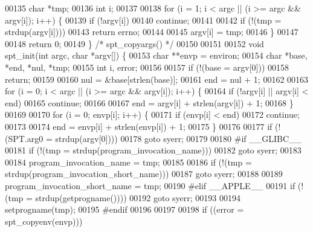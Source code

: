\begin{DoxyCode}
00135     \textcolor{keywordtype}{char} *tmp;
00136     \textcolor{keywordtype}{int} i;
00137 
00138     \textcolor{keywordflow}{for} (i = 1; i < argc || (i >= argc && argv[i]); i++) \{
00139         \textcolor{keywordflow}{if} (!argv[i])
00140             \textcolor{keywordflow}{continue};
00141 
00142         \textcolor{keywordflow}{if} (!(tmp = strdup(argv[i])))
00143             \textcolor{keywordflow}{return} errno;
00144 
00145         argv[i] = tmp;
00146     \}
00147 
00148     \textcolor{keywordflow}{return} 0;
00149 \} \textcolor{comment}{/* spt\_copyargs() */}
00150 
00151 
00152 \textcolor{keywordtype}{void} spt\_init(\textcolor{keywordtype}{int} argc, \textcolor{keywordtype}{char} *argv[]) \{
00153         \textcolor{keywordtype}{char} **envp = environ;
00154     \textcolor{keywordtype}{char} *base, *end, *nul, *tmp;
00155     \textcolor{keywordtype}{int} i, error;
00156 
00157     \textcolor{keywordflow}{if} (!(base = argv[0]))
00158         \textcolor{keywordflow}{return};
00159 
00160     nul = &base[strlen(base)];
00161     end = nul + 1;
00162 
00163     \textcolor{keywordflow}{for} (i = 0; i < argc || (i >= argc && argv[i]); i++) \{
00164         \textcolor{keywordflow}{if} (!argv[i] || argv[i] < end)
00165             \textcolor{keywordflow}{continue};
00166 
00167         end = argv[i] + strlen(argv[i]) + 1;
00168     \}
00169 
00170     \textcolor{keywordflow}{for} (i = 0; envp[i]; i++) \{
00171         \textcolor{keywordflow}{if} (envp[i] < end)
00172             \textcolor{keywordflow}{continue};
00173 
00174         end = envp[i] + strlen(envp[i]) + 1;
00175     \}
00176 
00177     \textcolor{keywordflow}{if} (!(SPT.arg0 = strdup(argv[0])))
00178         \textcolor{keywordflow}{goto} syerr;
00179 
00180 \textcolor{preprocessor}{#}\textcolor{preprocessor}{if} \_\_GLIBC\_\_
00181     \textcolor{keywordflow}{if} (!(tmp = strdup(program\_invocation\_name)))
00182         \textcolor{keywordflow}{goto} syerr;
00183 
00184     program\_invocation\_name = tmp;
00185 
00186     \textcolor{keywordflow}{if} (!(tmp = strdup(program\_invocation\_short\_name)))
00187         \textcolor{keywordflow}{goto} syerr;
00188 
00189     program\_invocation\_short\_name = tmp;
00190 \textcolor{preprocessor}{#}\textcolor{preprocessor}{elif} \textcolor{preprocessor}{\_\_APPLE\_\_}
00191     \textcolor{keywordflow}{if} (!(tmp = strdup(getprogname())))
00192         \textcolor{keywordflow}{goto} syerr;
00193 
00194     setprogname(tmp);
00195 \textcolor{preprocessor}{#}\textcolor{preprocessor}{endif}
00196 
00197 
00198     \textcolor{keywordflow}{if} ((error = spt\_copyenv(envp)))

\end{DoxyCode}
